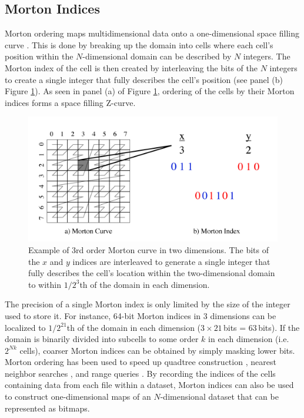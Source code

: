 \documentclass[apjl]{emulateapj}
\begin{document}
\subsection{Morton Indices}
Morton ordering maps multidimensional data onto a one-dimensional space filling curve \citep{Morton1996}. This is done by breaking up the domain into cells where each cell's position within the $N$-dimensional domain can be described by $N$ integers. The Morton index of the cell is then created by interleaving the bits of the $N$ integers to create a single integer that fully describes the cell's position (see panel (b) Figure \ref{fig:zorder}). As seen in panel (a) of Figure \ref{fig:zorder}, ordering of the cells by their Morton indices forms a space filling Z-curve.
%
\begin{figure}[htbp]
\begin{center}
\includegraphics[width=\columnwidth,keepaspectratio]{../images/zorder.png}
\caption{Example of 3rd order Morton curve in two dimensions. The bits of the $x$ and $y$ indices are interleaved to generate a single integer that fully describes the cell's location within the two-dimensional domain to within $1/2^{3}$th of the domain in each dimension.}
\label{fig:zorder}
\end{center}
\end{figure}
%

The precision of a single Morton index is only limited by the size of the integer used to store it. For instance, 64-bit Morton indices in 3 dimensions can be localized to $1/2^{21}$th of the domain in each dimension ($3\times21$\,bits = 63\,bits). If the domain is binarily divided into subcells to some order $k$ in each dimension (i.e. $2^{Nk}$ cells), coarser Morton indices can be obtained by simply masking lower bits. Morton ordering has been used to speed up quadtree construction \citep{Hjaltason2002}, nearest neighbor searches \citep{Connor2010}, and range queries \citep{Orenstein1984}. By recording the indices of the cells containing data from each file within a dataset, Morton indices can also be used to construct one-dimensional maps of an $N$-dimensional dataset that can be represented as bitmaps.
\end{document}
